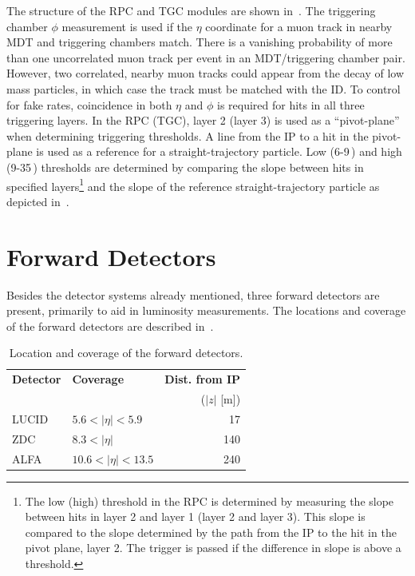 The structure of the RPC and TGC modules are shown in~\Fig{\ref{fig:muon_trigger_struct}}. The triggering chamber $\phi$ measurement is used if the $\eta$ coordinate for a muon track in nearby MDT and triggering chambers match. There is a vanishing probability of more than one uncorrelated muon track per event in an MDT/triggering chamber pair.
However, two correlated, nearby muon tracks could appear from the decay of low mass particles, in which case the track must be matched with the ID. To control for fake rates, coincidence in both $\eta$ and $\phi$ is required for hits in all three triggering layers. In the RPC (TGC), layer 2 (layer 3) is used as a ``pivot-plane'' when determining triggering thresholds. A line from the IP to a hit in the pivot-plane is used as a reference for a straight-trajectory particle. Low (6-9\,\GeV) and high (9-35\,\GeV) \pt thresholds are determined by comparing the slope between hits in specified layers\footnote{
	The low (high) \pt threshold in the RPC is determined by measuring the slope between hits in layer 2 and layer 1 (layer 2 and layer 3). This slope is compared to the slope determined by the path from the IP to the hit in the pivot plane, layer 2. The trigger is passed if the difference in slope is above a threshold.
} and the slope of the reference straight-trajectory particle as depicted in~\Fig{\ref{fig:muon_trigger}}.


\section{Forward Detectors}
Besides the detector systems already mentioned, three forward detectors are present, primarily to aid in luminosity measurements. The locations and coverage of the forward detectors are described in~\Tab{\ref{tab:fwd_loc}}. 

\begin{table}[tbp]
\begin{center}
\begin{tabular}{llr}
\hline
\textbf{Detector} & \textbf{Coverage} & \textbf{Dist. from IP} \\
&&($|z|$ [m]) \\\hline\hline
LUCID & $5.6 < |\eta| < 5.9$ &17\\
ZDC    & $8.3<|\eta|$ &140\\
ALFA  & $10.6 < |\eta|<13.5$ &240\\\hline
\end{tabular}
\end{center}
\caption[Location of forward detectors]{Location and coverage of the forward detectors.}
\label{tab:fwd_loc}
\end{table}

